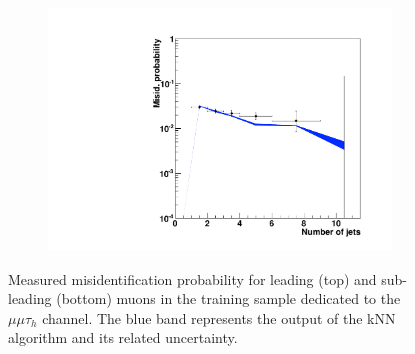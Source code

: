 \begin{figure}
\begin{subfigure}[b]{0.33\textwidth}
                \includegraphics[width=\textwidth]{4_Analisys/pics/8TeV/plots/fakerates/m_mmt_subleading_kNN_numJets20.pdf}
                \caption{}
        \end{subfigure}
        \caption{Measured misidentification probability for leading (top) and sub-leading (bottom) muons in the training sample dedicated to the $\mu\mu\tau_h$ channel. The blue band represents the output of the kNN algorithm and its related uncertainty.}\label{fig:fake_rate_mmt}
\end{figure}

